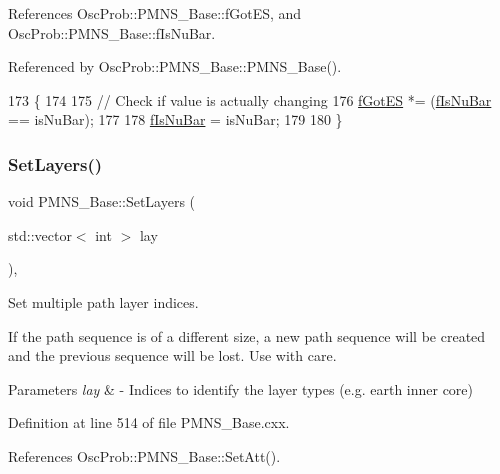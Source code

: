 References Osc\+Prob\+::\+P\+M\+N\+S\+\_\+\+Base\+::f\+Got\+ES, and Osc\+Prob\+::\+P\+M\+N\+S\+\_\+\+Base\+::f\+Is\+Nu\+Bar.



Referenced by Osc\+Prob\+::\+P\+M\+N\+S\+\_\+\+Base\+::\+P\+M\+N\+S\+\_\+\+Base().


\begin{DoxyCode}
173 \{
174 
175   \textcolor{comment}{// Check if value is actually changing}
176   \hyperlink{classOscProb_1_1PMNS__Base_a6dc5cd010d2d70b2324745b4e53e9839}{fGotES} *= (\hyperlink{classOscProb_1_1PMNS__Base_a0ebaeaefab36a3ff381c6293faedfdd6}{fIsNuBar} == isNuBar);
177 
178   \hyperlink{classOscProb_1_1PMNS__Base_a0ebaeaefab36a3ff381c6293faedfdd6}{fIsNuBar} = isNuBar;
179 
180 \}
\end{DoxyCode}
\mbox{\label{classOscProb_1_1PMNS__Base_a904e580edf89fb98bf9a6397739b4ebe}} 
\subsubsection{\texorpdfstring{Set\+Layers()}{SetLayers()}}
{\footnotesize\ttfamily void P\+M\+N\+S\+\_\+\+Base\+::\+Set\+Layers (\begin{DoxyParamCaption}\item[{std\+::vector$<$ int $>$}]{lay }\end{DoxyParamCaption})\hspace{0.3cm}{\ttfamily [virtual]}, {\ttfamily [inherited]}}

Set multiple path layer indices.

If the path sequence is of a different size, a new path sequence will be created and the previous sequence will be lost. Use with care.


\begin{DoxyParams}{Parameters}
{\em lay} & -\/ Indices to identify the layer types (e.\+g. earth inner core) \\
\hline
\end{DoxyParams}


Definition at line 514 of file P\+M\+N\+S\+\_\+\+Base.\+cxx.



References Osc\+Prob\+::\+P\+M\+N\+S\+\_\+\+Base\+::\+Set\+Att().



